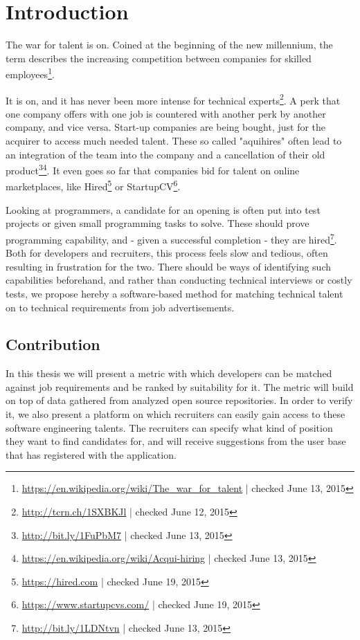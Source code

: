 \chapter{Introduction}\label{ch:introduction}
The war for talent is on. Coined at the beginning of the new
millennium, the term describes the increasing competition between companies
for skilled employees\footnote{\url{https://en.wikipedia.org/wiki/The_war_for_talent} | checked June 13, 2015}.

It is on, and it has never been more intense for technical experts\footnote{\url{http://tcrn.ch/1SXBKJl} | checked June 12, 2015}.
A perk that one company offers with one job is countered with another perk by
another company, and vice versa. Start-up companies are being bought,
just for the acquirer to access much needed talent.
These so called "aquihires" often lead to an integration of the team into
the company and a cancellation of their old product\footnote{\url{http://bit.ly/1FuPbM7} | checked June 13, 2015}\footnote{\url{https://en.wikipedia.org/wiki/Acqui-hiring} | checked June 13, 2015}.
It even goes so far that companies bid for talent on online marketplaces, like
Hired\footnote{\url{https://hired.com} | checked June 19, 2015} or StartupCV\footnote{\url{https://www.startupcvs.com/} | checked June 19, 2015}.
\newline

Looking at programmers, a candidate for an opening is often put into test projects or given small programming tasks to solve. These should prove programming capability, and - given a successful completion - they are hired\footnote{\url{http://bit.ly/1LDNtvn} | checked June 13, 2015}. Both for developers and recruiters, this process feels slow and tedious, often resulting in frustration for the two. There should be ways of identifying such capabilities beforehand, and rather than conducting technical interviews or costly tests, we propose hereby a software-based method for matching technical talent on to technical requirements from job advertisements.

\section{Contribution}
In this thesis we will present a metric with which developers can be matched against job requirements and be ranked by suitability for it. The metric will build on top of data gathered from analyzed open source repositories. In order to verify it, we also present a platform on which recruiters can easily gain access to these software engineering talents. The recruiters can specify what kind of position they want to find candidates for, and will receive suggestions from the user base that has registered with the application.


